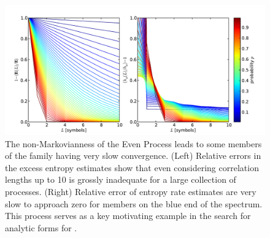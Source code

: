 \begin{figure}[h!]
\centering
\includegraphics[scale = 0.6]{../chapter1/figures/scripts/E_hmu_Even_all_reldiff}
\caption{The non-Markovianness of the Even Process leads to some members of the family having very slow convergence. (Left) Relative errors in the excess entropy estimates show that even considering correlation lengths up to 10 is grossly inadequate for a large collection of processes. (Right) Relative error of entropy rate estimates are very slow to approach zero for members on the blue end of the spectrum. This process serves as a key motivating example in the search for analytic forms for \EE.}
\label{fig:E_hmu_Even_all_reldiff}
\end{figure}

